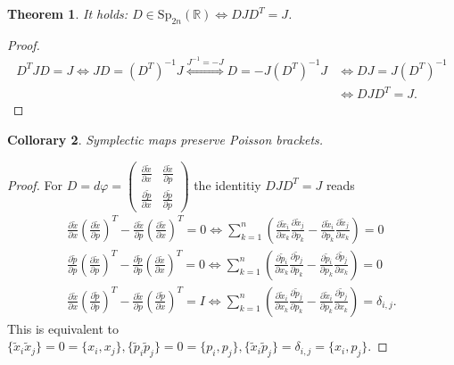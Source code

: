 \documentclass[a4paper, 11pt]{article}
\newtheorem{theorem}{Theorem}
\newtheorem{collorary}[theorem]{Collorary}
\begin{document}
\begin{theorem}
	It holds: $D \in \mathrm{Sp}_{2n}(\mathbb R) \iff DJD^T = J$.
\end{theorem}

\begin{proof}
	\begin{align*}
		D^TJD = J \iff JD = (D^T)^{-1}J \overset{J^{-1} = -J}{\iff} D = -J(D^T)^{-1}J &\iff DJ = J(D^T)^{-1} \\ &\iff DJD^T = J.
	\end{align*}
\end{proof}

\begin{collorary}
	Symplectic maps preserve Poisson brackets.
\end{collorary}
\begin{proof}
	For $D = d\varphi = \begin{pmatrix}
		\frac{\partial \tilde x}{\partial x} & \frac{\partial \tilde x}{\partial p} \\
		\frac{\partial \tilde p}{\partial x} & \frac{\partial \tilde p}{\partial p}
	\end{pmatrix}$ the identitiy $DJD^T = J$ reads
	\begin{align*}
		\frac{\partial \tilde x}{\partial x}(\frac{\partial \tilde x}{\partial p})^T - \frac{\partial \tilde x}{\partial p}(\frac{\partial \tilde x}{\partial x})^T = 0
		\iff \sum^n_{k=1}(\frac{\partial \tilde x_i}{\partial x_k} \frac{\partial \tilde x_j}{\partial p_k} - \frac{\partial \tilde x_i}{\partial p_k} \frac{\partial \tilde x_j}{\partial x_k}) = 0
		 \\
		\frac{\partial \tilde p}{\partial p}(\frac{\partial \tilde x}{\partial p})^T - \frac{\partial \tilde p}{\partial p}(\frac{\partial \tilde x}{\partial x})^T = 0 
		\iff \sum^n_{k=1}(\frac{\partial \tilde p_i}{\partial x_k} \frac{\partial \tilde p_j}{\partial p_k} - \frac{\partial \tilde p_i}{\partial p_k} \frac{\partial \tilde p_j}{\partial x_k}) = 0
		\\
		\frac{\partial \tilde x}{\partial x}(\frac{\partial \tilde p}{\partial p})^T - \frac{\partial \tilde x}{\partial p}(\frac{\partial \tilde p}{\partial x})^T =  I 
		\iff \sum^n_{k=1}(\frac{\partial \tilde x_i}{\partial x_k} \frac{\partial \tilde p_j}{\partial p_k} - \frac{\partial \tilde x_i}{\partial p_k} \frac{\partial \tilde p_j}{\partial x_k}) = \delta_{i,j}.
	\end{align*}
	This is equivalent to $\{ \tilde x_i \tilde x_j \} = 0 = \{ x_i,x_j \}, \{ \tilde p_i \tilde p_j \} = 0 = \{ p_i,p_j \}, \{ \tilde x_i \tilde p_j \} = \delta_{i,j} = \{ x_i,p_j \}$.
\end{proof}
\end{document}
